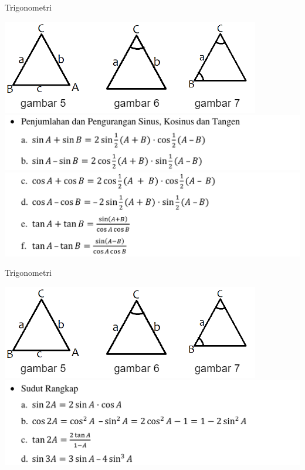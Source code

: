 \documentclass[pdflatex,compress,mathserif]{beamer}
\begin{document}
	\begin{frame}{Trigonometri}
		\begin{center}
			\includegraphics[width=0.5\linewidth]{pict/26}
			\includegraphics[width=0.9\linewidth]{pict/30}
			\includegraphics[width=0.9\linewidth]{pict/31}
		\end{center}
	\end{frame}

	\begin{frame}{Trigonometri}
		\begin{center}
			\includegraphics[width=0.5\linewidth]{pict/26}
			\includegraphics[width=0.9\linewidth]{pict/32}
		\end{center}
	\end{frame}
\end{document}
